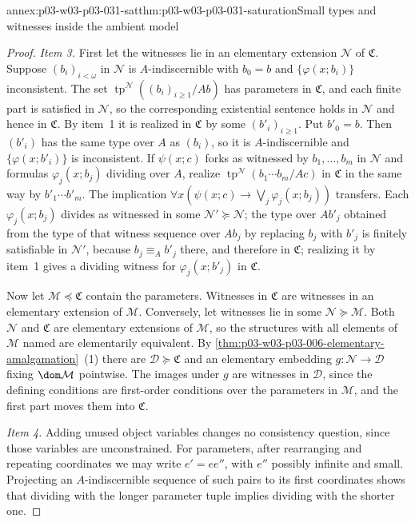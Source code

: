 \begin{annexitem}{annex:p03-w03-p03-031-sat}{thm:p03-w03-p03-031-saturation}{Small types and witnesses inside the ambient model}
\begin{proof}
\emph{Item 3.}  First let the witnesses lie in an elementary extension
\(\mathcal N\) of \(\mathfrak C\).  Suppose
\((b_i)_{i<\omega}\) in \(\mathcal N\) is \(A\)-indiscernible with
\(b_0=b\) and \(\{\varphi(x;b_i)\}\) inconsistent.  The set
\(\operatorname{tp}^{\mathcal N}((b_i)_{i\geq1}/Ab)\) has parameters in
\(\mathfrak C\), and each finite part is satisfied in \(\mathcal N\), so
the corresponding existential sentence holds in \(\mathcal N\) and hence in
\(\mathfrak C\).  By item~1 it is realized in \(\mathfrak C\) by some
\((b'_i)_{i\geq1}\).  Put \(b'_0=b\).  Then \((b'_i)\) has the same type
over \(A\) as \((b_i)\), so it is \(A\)-indiscernible and
\(\{\varphi(x;b'_i)\}\) is inconsistent.  If \(\psi(x;c)\) forks as
witnessed by \(b_1,\ldots,b_m\) in \(\mathcal N\) and formulas
\(\varphi_j(x;b_j)\) dividing over \(A\), realize
\(\operatorname{tp}^{\mathcal N}(b_1\cdots b_m/Ac)\) in \(\mathfrak C\) in
the same way by \(b'_1\cdots b'_m\).  The implication
\(\forall x(\psi(x;c)\to\bigvee_j\varphi_j(x;b_j))\) transfers.  Each
\(\varphi_j(x;b_j)\) divides as witnessed in some
\(\mathcal N'\succcurlyeq\mathcal N\); the type over \(Ab'_j\) obtained from
the type of that witness sequence over \(Ab_j\) by replacing \(b_j\) with
\(b'_j\) is finitely satisfiable in \(\mathcal N'\), because
\(b_j\equiv_Ab'_j\) there, and therefore in \(\mathfrak C\); realizing it
by item~1 gives a dividing witness for \(\varphi_j(x;b'_j)\) in
\(\mathfrak C\).

Now let \(\mathcal M\preccurlyeq\mathfrak C\) contain the parameters.
Witnesses in \(\mathfrak C\) are witnesses in an elementary extension of
\(\mathcal M\).  Conversely, let witnesses lie in some
\(\mathcal N\succcurlyeq\mathcal M\).  Both \(\mathcal N\) and
\(\mathfrak C\) are elementary extensions of \(\mathcal M\), so the
structures with all elements of \(\mathcal M\) named are elementarily
equivalent.  By \cref{thm:p03-w03-p03-006-elementary-amalgamation}~(1)
there are \(\mathcal D\succcurlyeq\mathfrak C\) and an elementary
embedding \(g:\mathcal N\to\mathcal D\) fixing \(\dom\mathcal M\)
pointwise.  The images under \(g\) are witnesses in \(\mathcal D\), since
the defining conditions are first-order conditions over the parameters
in \(\mathcal M\), and the first part moves them into \(\mathfrak C\).

\emph{Item 4.}  Adding unused object variables changes no consistency
question, since those variables are unconstrained.  For parameters, after
rearranging and repeating coordinates we may write \(e'=ee''\), with
\(e''\) possibly infinite and small.  Projecting an
\(A\)-indiscernible sequence of such pairs to its first coordinates shows
that dividing with the longer parameter tuple implies dividing with the
shorter one.


\end{proof}
\end{annexitem}
